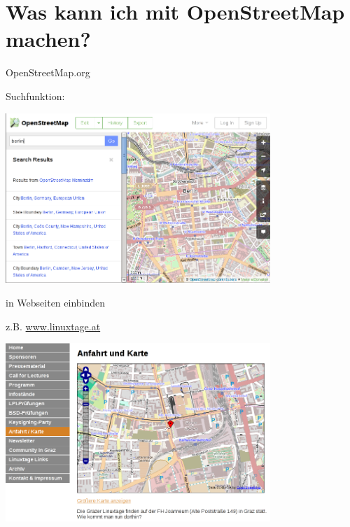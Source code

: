 \documentclass{beamer}
\begin{document}
\section{Was kann ich mit OpenStreetMap machen?}


\begin{frame}{OpenStreetMap.org}

	Suchfunktion:

	\includegraphics[width=10cm]{osm-org.png}

\end{frame}

\begin{frame}{in Webseiten einbinden}

	z.B. \url{www.linuxtage.at}

	\includegraphics[width=10cm]{glt.png}

\end{frame}
\end{document}
